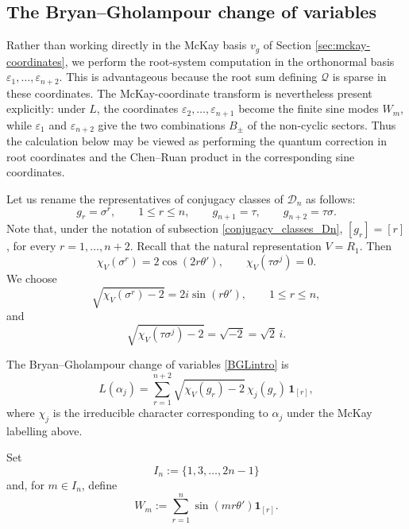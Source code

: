 \documentclass[a4paper,reqno]{amsart}
\theoremstyle{plain} %
\theoremstyle{definition} %
\theoremstyle{remark} %
\newcommand{\cD}{{\mathcal D}}
\newcommand{\1}{\mathds{1}}   %
\begin{document}
\subsection{The Bryan--Gholampour change of variables}

Rather than working directly in the McKay basis \(v_g\) of Section \ref{sec:mckay-coordinates}, 
we perform the root-system computation in the orthonormal basis \(\varepsilon_1,\ldots,\varepsilon_{n+2}\). 
This is advantageous because the root sum defining \(\mathcal Q\) is sparse in these coordinates. 
The McKay-coordinate transform is nevertheless present explicitly: under \(L\), 
the coordinates \(\varepsilon_2,\ldots,\varepsilon_{n+1}\) become the finite sine modes \(W_m\), 
while \(\varepsilon_1\) and \(\varepsilon_{n+2}\) give the two combinations \(B_\pm\) of the non-cyclic sectors. 
Thus the calculation below may be viewed as performing the quantum correction in root coordinates 
and the Chen–Ruan product in the corresponding sine coordinates.


Let us rename the representatives of conjugacy classes of $\cD_n$ as follows:
\[
g_r=\sigma^r,
\qquad
1\le r\le n,
\qquad
g_{n+1}=\tau,
\qquad
g_{n+2}=\tau\sigma.
\]
Note that, under the notation of subsection \ref{conjugacy_classes_Dn}, $[g_r]=[r]$, for every $r=1, \ldots , n+2$.
Recall that the natural representation $V=R_1$. Then
\[
\chi_V(\sigma^r)=2\cos(2r\theta'),
\qquad
\chi_V(\tau\sigma^j)=0.
\]
We choose
\[
\sqrt{\chi_V(\sigma^r)-2}
=
2i\sin(r\theta'),
\qquad
1\le r\le n,
\]
and
\[
\sqrt{\chi_V(\tau\sigma^j)-2}
=
\sqrt{-2}
=
\sqrt2\,i.
\]

The Bryan--Gholampour change of variables \eqref{BGLintro} is
\[
L(\alpha_j)
=
\sum_{r=1}^{n+2}
\sqrt{\chi_V(g_r)-2}\,
\chi_j(g_r)\,
\mathbf1_{[r]},
\]
where \(\chi_j\) is the irreducible character corresponding to
\(\alpha_j\) under the McKay labelling above.

Set
\[
I_n:=\{1,3,\ldots,2n-1\}
\]
and, for \(m\in I_n\), define
\[
W_m
:=
\sum_{r=1}^n
\sin(mr\theta')\mathbf1_{[r]}.
\]
\end{document}
